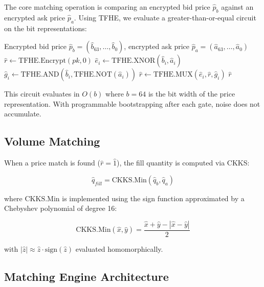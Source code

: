 \documentclass[11pt,letterpaper]{article}
\theoremstyle{definition}
\theoremstyle{remark}
\newcommand{\TFHE}{\textsc{TFHE}}
\newcommand{\CKKS}{\textsc{CKKS}}
\begin{document}
The core matching operation is comparing an encrypted bid price $\hat{p}_b$ against an encrypted ask price $\hat{p}_a$. Using \TFHE{}, we evaluate a greater-than-or-equal circuit on the bit representations:

\begin{algorithm}
\caption{Encrypted Price Comparison (\TFHE{})}
\begin{algorithmic}[1]
\REQUIRE Encrypted bid price $\hat{p}_b = (\hat{b}_{63}, \ldots, \hat{b}_0)$, encrypted ask price $\hat{p}_a = (\hat{a}_{63}, \ldots, \hat{a}_0)$
\STATE $\hat{r} \leftarrow \text{TFHE.Encrypt}(pk, 0)$ 
    \STATE $\hat{e}_i \leftarrow \text{TFHE.XNOR}(\hat{b}_i, \hat{a}_i)$ 
    \STATE $\hat{g}_i \leftarrow \text{TFHE.AND}(\hat{b}_i, \text{TFHE.NOT}(\hat{a}_i))$ 
    \STATE $\hat{r} \leftarrow \text{TFHE.MUX}(\hat{e}_i, \hat{r}, \hat{g}_i)$ 
\ENDFOR
\RETURN $\hat{r}$ 
\end{algorithmic}
\end{algorithm}

This circuit evaluates in $O(b)$ where $b = 64$ is the bit width of the price representation. With programmable bootstrapping after each gate, noise does not accumulate.

\subsection{Volume Matching}

When a price match is found ($\hat{r} = \hat{1}$), the fill quantity is computed via \CKKS{}:

\begin{equation}
\hat{q}_{\textit{fill}} = \text{CKKS.Min}(\hat{q}_b, \hat{q}_a)
\end{equation}

where $\text{CKKS.Min}$ is implemented using the sign function approximated by a Chebyshev polynomial of degree 16:

\begin{equation}
\text{CKKS.Min}(\hat{x}, \hat{y}) = \frac{\hat{x} + \hat{y} - |\hat{x} - \hat{y}|}{2}
\end{equation}

with $|\hat{z}| \approx \hat{z} \cdot \text{sign}(\hat{z})$ evaluated homomorphically.

\subsection{Matching Engine Architecture}
\end{document}
